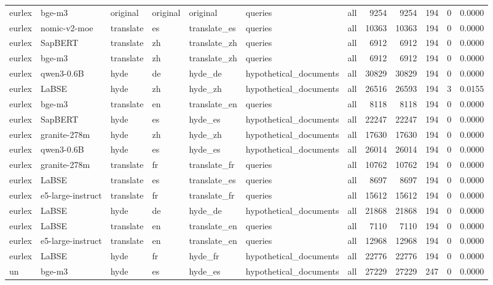 \begin{tabular}{lllllllrrrrr}
eurlex & bge-m3 & original & original & original & queries & all & 9254 & 9254 & 194 & 0 & 0.0000 \\
eurlex & nomic-v2-moe & translate & es & translate\_es & queries & all & 10363 & 10363 & 194 & 0 & 0.0000 \\
eurlex & SapBERT & translate & zh & translate\_zh & queries & all & 6912 & 6912 & 194 & 0 & 0.0000 \\
eurlex & bge-m3 & translate & zh & translate\_zh & queries & all & 6912 & 6912 & 194 & 0 & 0.0000 \\
eurlex & qwen3-0.6B & hyde & de & hyde\_de & hypothetical\_documents & all & 30829 & 30829 & 194 & 0 & 0.0000 \\
eurlex & LaBSE & hyde & zh & hyde\_zh & hypothetical\_documents & all & 26516 & 26593 & 194 & 3 & 0.0155 \\
eurlex & bge-m3 & translate & en & translate\_en & queries & all & 8118 & 8118 & 194 & 0 & 0.0000 \\
eurlex & SapBERT & hyde & es & hyde\_es & hypothetical\_documents & all & 22247 & 22247 & 194 & 0 & 0.0000 \\
eurlex & granite-278m & hyde & zh & hyde\_zh & hypothetical\_documents & all & 17630 & 17630 & 194 & 0 & 0.0000 \\
eurlex & qwen3-0.6B & hyde & es & hyde\_es & hypothetical\_documents & all & 26014 & 26014 & 194 & 0 & 0.0000 \\
eurlex & granite-278m & translate & fr & translate\_fr & queries & all & 10762 & 10762 & 194 & 0 & 0.0000 \\
eurlex & LaBSE & translate & es & translate\_es & queries & all & 8697 & 8697 & 194 & 0 & 0.0000 \\
eurlex & e5-large-instruct & translate & fr & translate\_fr & queries & all & 15612 & 15612 & 194 & 0 & 0.0000 \\
eurlex & LaBSE & hyde & de & hyde\_de & hypothetical\_documents & all & 21868 & 21868 & 194 & 0 & 0.0000 \\
eurlex & LaBSE & translate & en & translate\_en & queries & all & 7110 & 7110 & 194 & 0 & 0.0000 \\
eurlex & e5-large-instruct & translate & en & translate\_en & queries & all & 12968 & 12968 & 194 & 0 & 0.0000 \\
eurlex & LaBSE & hyde & fr & hyde\_fr & hypothetical\_documents & all & 22776 & 22776 & 194 & 0 & 0.0000 \\
un & bge-m3 & hyde & es & hyde\_es & hypothetical\_documents & all & 27229 & 27229 & 247 & 0 & 0.0000 \\

\end{tabular}
